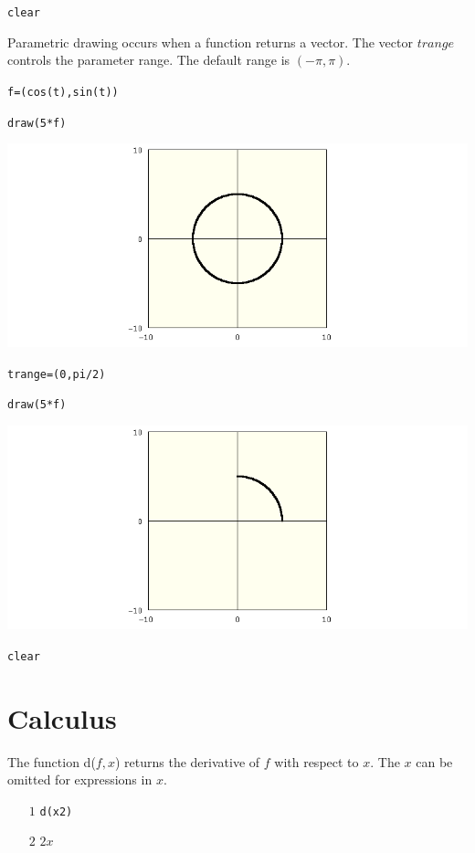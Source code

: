 \documentclass[12pt,openany]{report}
\begin{document}
{\tt clear}

\newpage

\noindent
Parametric drawing occurs when a function returns a vector.
The vector $trange$ controls the parameter range.
The default range is $(-\pi,\pi)$.

\medskip
{\tt f=(cos(t),sin(t))}

{\tt draw(5*f)}

\includegraphics[scale=0.5]{circle.png}

{\tt trange=(0,pi/2)}

{\tt draw(5*f)}

\includegraphics[scale=0.5]{circle2.png}

{\tt clear}

\chapter{Calculus}

\label{d}

The function d($f,x$) returns the derivative of $f$ with respect to $x$.
The $x$ can be omitted for expressions in $x$.
\begin{itemize}
\item[$\scriptstyle1$]{\tt d(x{}2)}
\item[$\scriptstyle2$]\hspace{50pt} $2x$
\end{itemize}
\end{document}
